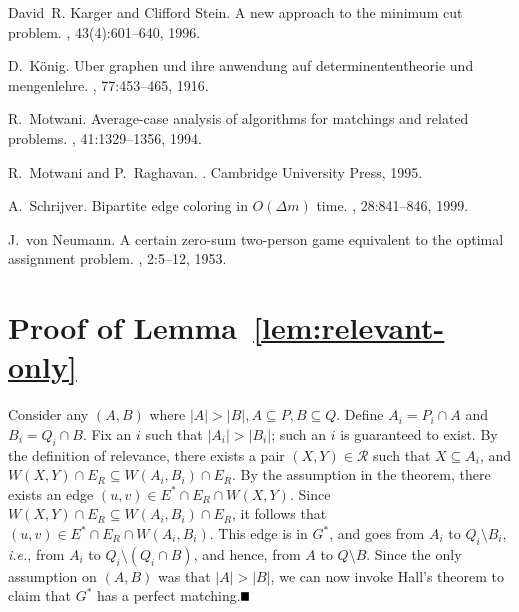 \documentclass[11pt]{article}
\newcommand{\qed}{\mbox{}\hspace*{\fill}\nolinebreak\mbox{$\rule{0.6em}{0.6em}$}
}
\newcommand{\coll}{{\mathcal R}}
\begin{document}
\begin{thebibliography}{10}
David~R. Karger and Clifford Stein.
\newblock A new approach to the minimum cut problem.
, 43(4):601--640, 1996.

D.~K\"{o}nig.
\newblock Uber graphen und ihre anwendung auf determinententheorie und
  mengenlehre.
, 77:453--465, 1916.

R.~Motwani.
\newblock Average-case analysis of algorithms for matchings and related
  problems.
, 41:1329--1356, 1994.

R.~Motwani and P.~Raghavan.
.
\newblock Cambridge University Press, 1995.

A.~Schrijver.
\newblock Bipartite edge coloring in {$O(\Delta m)$} time.
, 28:841--846, 1999.

J.~von Neumann.
\newblock A certain zero-sum two-person game equivalent to the optimal
  assignment problem.
, 2:5--12, 1953.

\end{thebibliography}

\appendix

\section{Proof of Lemma~\ref{lem:relevant-only}}
\label{append:relevant-only}
Consider any $(A,B)$ where $|A| > |B|, A\subseteq P, B\subseteq Q$.  Define
$A_i = P_i \cap A$ and $B_i = Q_i \cap B$. Fix an $i$ such that $|A_i| >
|B_i|$; such an $i$ is guaranteed to exist. By the definition of relevance,
there exists a pair $(X,Y)\in \coll$ such that $X\subseteq A_i$, and $W(X,Y)
\cap E_R \subseteq W(A_i,B_i)\cap E_R$. By the assumption in the theorem,
there exists an edge $(u,v) \in E^* \cap E_R \cap W(X,Y)$. Since $W(X,Y) \cap
E_R \subseteq W(A_i,B_i)\cap E_R$, it follows that $(u,v) \in E^* \cap E_R
\cap W(A_i,B_i)$. This edge is in $G^*$, and goes from $A_i$ to $Q_i \setminus
B_i$, {\em i.e.}, from $A_i$ to $Q_i \setminus (Q_i \cap B)$, and hence, from $A$ to
$Q\setminus B$. Since the only assumption on $(A,B)$ was that $|A| > |B|$, we
can now invoke Hall's theorem to claim that $G^*$ has a perfect
matching.$\qed$
\end{document}
